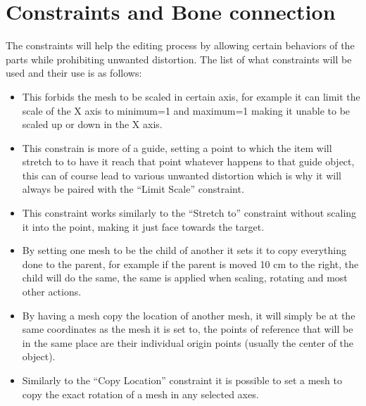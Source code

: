 \documentclass[letterpaper,10pt,english]{jupyterBook}
\begin{document}
\section{Constraints and Bone connection}
\label{\detokenize{Setting the Rig:constraints-and-bone-connection}}
\sphinxAtStartPar
The constraints will help the editing process by allowing certain behaviors of the parts while prohibiting unwanted distortion. The list of what constraints will be used and their use is as follows:
\begin{itemize}
\item {} 
\sphinxAtStartPar
{} This forbids the mesh to be scaled in certain axis, for example it can limit the scale of the X axis to minimum=1 and maximum=1 making it unable to be scaled up or down in the X axis.

\item {} 
\sphinxAtStartPar
{} This constrain is more of a guide, setting a point to which the item will stretch to to have it reach that point whatever happens to that guide object, this can of course lead to various unwanted distortion which is why it will always be paired with the “Limit Scale” constraint.

\item {} 
\sphinxAtStartPar
{} This constraint works similarly to the “Stretch to” constraint without scaling it into the point, making it just face towards the target.

\item {} 
\sphinxAtStartPar
{} By setting one mesh to be the child of another it sets it to copy everything done to the parent, for example if the parent is moved 10 cm to the right, the child will do the same, the same is applied when scaling, rotating and most other actions.

\item {} 
\sphinxAtStartPar
{} By having a mesh copy the location of another mesh, it will simply be at the same coordinates as the mesh it is set to, the points of reference that will be in the same place are their individual origin points (usually the center of the object).

\item {} 
\sphinxAtStartPar
{} Similarly to the “Copy Location” constraint it is possible to set a mesh to copy the exact rotation of a mesh in any selected axes.

\end{itemize}
\end{document}
